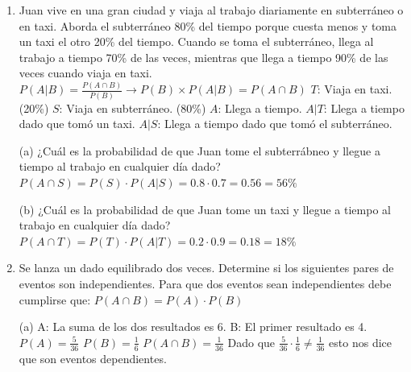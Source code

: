 \documentclass[a4paper, 12pt]{article}
\newcommand{\Pspace}{0.5cm}
\newcommand{\Aspace}{0.2cm}
\begin{document}
\begin{enumerate}
    \item Juan vive en una gran ciudad y viaja al trabajo diariamente en subterráneo o en taxi. Aborda el subterráneo 80\% del tiempo porque cuesta menos y toma un taxi el otro 20\% del tiempo. Cuando se toma el subterráneo, llega al trabajo a tiempo 70\% de las veces, mientras que llega a tiempo 90\% de las veces cuando viaja en taxi.
    \newline $P(A | B) = \frac{P(A \cap B)}{P(B)} \rightarrow P(B) \times P(A | B) = P(A \cap B)$
    \newline $T$: Viaja en taxi. (20\%)
    \newline $S$: Viaja en subterráneo. (80\%)
    \newline $A$: Llega a tiempo.
    \newline $A | T$: Llega a tiempo dado que tomó un taxi.
    \newline $A | S$: Llega a tiempo dado que tomó el subterráneo.
    \vspace{\Aspace} \par
    (a) ¿Cuál es la probabilidad de que Juan tome el subterrábneo y llegue a tiempo al trabajo en cualquier día dado?
    \\ { \color{azul} 
        $P(A \cap S) = P(S) \cdot P(A | S) = 0{.}8 \cdot 0{.}7 = 0{.}56 = 56\%$
    }

    \vspace{\Aspace}
    (b) ¿Cuál es la probabilidad de que Juan tome un taxi y llegue a tiempo al trabajo en cualquier día dado?
    \\ { \color{azul}  
        $P(A \cap T) = P(T) \cdot P(A | T) = 0{.}2 \cdot 0{.}9 = 0{.}18 = 18\%$    
    }


    \vspace{\Pspace}
    \item Se lanza un dado equilibrado dos veces. Determine si los siguientes pares de eventos son independientes.
    \newline Para que dos eventos sean independientes debe cumplirse que: 
    \newline $P(A \cap B) = P(A) \cdot P(B)$
    \vspace{\Aspace} \par
    (a) A: La suma de los dos resultados es 6. B: El primer resultado es 4.
    \\ { \color{azul} 
        $P(A) = \frac{5}{36}$
        \newline $P(B) = \frac{1}{6}$
        \newline $P(A \cap B) = \frac{1}{36}$
        \newline Dado que $\frac{5}{36} \cdot \frac{1}{6} \neq \frac{1}{36}$ esto nos dice que son eventos dependientes.
    }


\end{enumerate}
\end{document}

